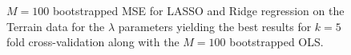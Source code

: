 \documentclass[reprint, english, nofootinbib]{revtex4-2}
\begin{document}
\begin{figure}
    \centering
     \caption{\label{fig:terrain_bootstrap}$M=100$ bootstrapped MSE for LASSO and Ridge regression on the Terrain data for the $\lambda$ parameters yielding the best results for $k=5$ fold cross-validation along with the $M = 100$ bootstrapped OLS.}
     \label{contour plots}
\end{figure}
\end{document}
